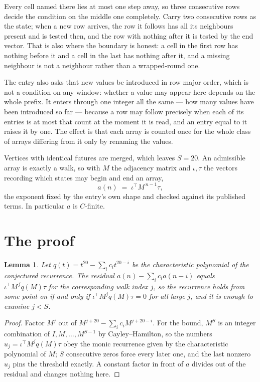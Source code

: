 \documentclass[11pt,a4paper]{article}
\theoremstyle{plain}
\newtheorem{lemma}[theorem]{Lemma}
\theoremstyle{definition}
\begin{document}
Every cell named there lies at most one step away, so three consecutive rows decide the condition on the middle one completely. Carry two consecutive rows as the state; when a new row arrives, the row it follows has all its neighbours present and is tested then, and the row with nothing after it is tested by the end vector. That is also where the boundary is honest: a cell in the first row has nothing before it and a cell in the last has nothing after it, and a missing neighbour is not a neighbour rather than a wrapped-round one.

The entry also asks that new values be introduced in row major order, which is not a condition on any window: whether a value may appear here depends on the whole prefix. It enters through one integer all the same --- how many values have been introduced so far --- because a row may follow precisely when each of its entries is at most that count at the moment it is read, and an entry equal to it raises it by one. The effect is that each array is counted once for the whole class of arrays differing from it only by renaming the values.

Vertices with identical futures are merged, which leaves $S=20$. An admissible array is exactly a walk, so with $M$ the adjacency matrix and $\iota,\tau$ the vectors recording which states may begin and end an array,
\[
a(n)\;=\;\iota^{\!\top}M^{\,n-1}\tau ,
\]
the exponent fixed by the entry's own shape and checked against its published terms. In
particular $a$ is $C$-finite.

\section{The proof}

\begin{lemma}\label{lem:crit}
Let $q(t)=t^{20}-\sum_i c_it^{20-i}$ be the characteristic polynomial of the
conjectured recurrence. The residual $a(n)-\sum_ic_ia(n-i)$ equals
$\iota^{\!\top}M^{\,j}q(M)\tau$ for the corresponding walk index $j$, so the recurrence
holds from some point on if and only if $\iota^{\!\top}M^{j}q(M)\tau=0$ for all large $j$,
and it is enough to examine $j<S$.
\end{lemma}

\begin{proof}
Factor $M^{j}$ out of $M^{j+20}-\sum_ic_iM^{j+20-i}$. For the bound, $M^{S}$
is an integer combination of $I,M,\dots,M^{S-1}$ by Cayley--Hamilton, so the numbers
$u_j=\iota^{\!\top}M^{j}q(M)\tau$ obey the monic recurrence given by the characteristic
polynomial of $M$; $S$ consecutive zeros force every later one, and the last nonzero $u_j$
pins the threshold exactly. A constant factor in front of $a$ divides out of the residual and
changes nothing here.
\end{proof}
\end{document}
